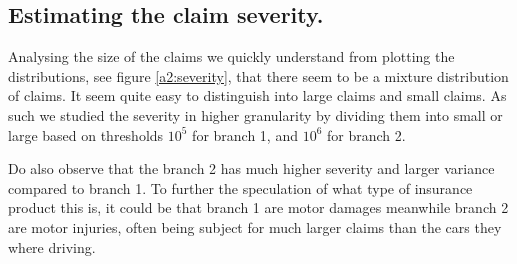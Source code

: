 \documentclass[11pt]{article}
\begin{document}
\subsection*{Estimating the claim severity.}
Analysing the size of the claims we quickly understand from plotting the distributions, see figure \ref{a2:severity}, that there seem to be a mixture distribution of claims.
It seem quite easy to distinguish into large claims and small claims.
As such we studied the severity in higher granularity by dividing them into small or large based on thresholds $10^5$ for branch 1, and $10^6$ for branch 2.

Do also observe that the branch 2 has much higher severity and larger variance compared to branch 1. 
To further the speculation of what type of insurance product this is, it could be that branch 1 are motor damages meanwhile branch 2 are motor injuries, often being subject for much larger claims than the cars they where driving.
\end{document}
